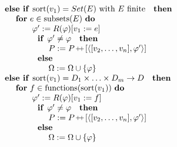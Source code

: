 \documentclass{article}
\providecommand{\concat}{\ensuremath{\hspace{0.12em}\raisebox{0.2ex}{\text{\scriptsize+}\!\text{\scriptsize+}}\hspace{0.12em}}}
\begin{document}
\[
\begin{tabular}{l}
\qquad \qquad \qquad $\text{\textbf{else if }}\mathrm{sort}(v_{1})=Set(E)$
with $E$ finite$\text{ \textbf{then}}$ \\ 
\qquad \qquad \qquad \qquad \textbf{for} $e\in \mathrm{subsets}(E)$ \textbf{%
do} \\ 
\qquad \qquad \qquad \qquad \qquad $\varphi ^{\prime }:=R(\varphi )[v_{1}:=e]
$ \\ 
\qquad \qquad \qquad \qquad \qquad $\text{\textbf{if }}\varphi ^{\prime
}\neq \varphi \text{ \textbf{then}}$ \\ 
\qquad \qquad \qquad \qquad \qquad \qquad $P:=P\concat\lbrack \left\langle
[v_{2},\ldots ,v_{n}],\varphi ^{\prime }\right\rangle ]$ \\ 
\qquad \qquad \qquad \qquad \qquad $\text{\textbf{else}}$ \\ 
\qquad \qquad \qquad \qquad \qquad \qquad $\Omega :=\Omega \cup \left\{
\varphi \right\} $ \\ 
\qquad \qquad \qquad $\text{\textbf{else if }}\mathrm{sort}%
(v_{1})=D_{1}\times \ldots \times D_{m}\rightarrow D\text{ \textbf{then}}$
\\ 
\qquad \qquad \qquad \qquad \textbf{for} $f\in \mathrm{functions}(\mathrm{%
sort}(v_{1}))$ \textbf{do} \\ 
\qquad \qquad \qquad \qquad \qquad $\varphi ^{\prime }:=R(\varphi )[v_{1}:=f]
$ \\ 
\qquad \qquad \qquad \qquad \qquad $\text{\textbf{if }}\varphi ^{\prime
}\neq \varphi \text{ \textbf{then}}$ \\ 
\qquad \qquad \qquad \qquad \qquad \qquad $P:=P\concat\lbrack \left\langle
[v_{2},\ldots ,v_{n}],\varphi ^{\prime }\right\rangle ]$ \\ 
\qquad \qquad \qquad \qquad \qquad $\text{\textbf{else}}$ \\ 
\qquad \qquad \qquad \qquad \qquad \qquad $\Omega :=\Omega \cup \left\{
\varphi \right\} $%
\end{tabular}%
\]
\end{document}
